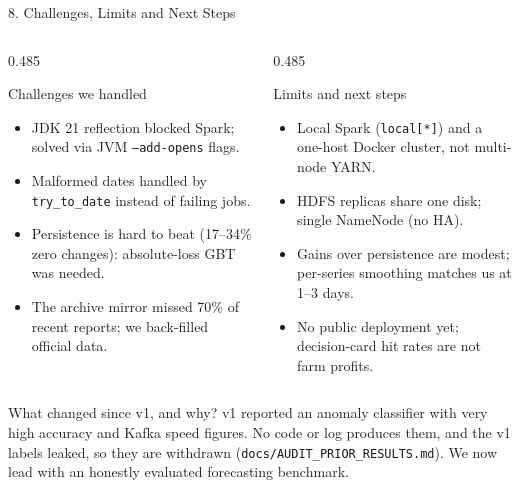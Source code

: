 \documentclass[aspectratio=169,10pt]{beamer}
\begin{document}
\begin{frame}{8. Challenges, Limits and Next Steps}
  \begin{columns}[T,onlytextwidth]
    \begin{column}{0.485\textwidth}
      \begin{block}{Challenges we handled}
        \footnotesize
        \begin{itemize}
          \item JDK 21 reflection blocked Spark; solved via JVM \texttt{--add-opens} flags.
          \item Malformed dates handled by \texttt{try\_to\_date} instead of failing jobs.
          \item Persistence is hard to beat (17--34\% zero changes): absolute-loss GBT was needed.
          \item The archive mirror missed 70\% of recent reports; we back-filled official data.
        \end{itemize}
      \end{block}
    \end{column}

    \begin{column}{0.485\textwidth}
      \begin{block}{Limits and next steps}
        \footnotesize
        \begin{itemize}
          \item Local Spark (\texttt{local[*]}) and a one-host Docker cluster, not multi-node YARN.
          \item HDFS replicas share one disk; single NameNode (no HA).
          \item Gains over persistence are modest; per-series smoothing matches us at 1--3 days.
          \item No public deployment yet; decision-card hit rates are not farm profits.
        \end{itemize}
      \end{block}
    \end{column}
  \end{columns}

  \vspace{0.05cm}
  \begin{block}{What changed since v1, and why?}
    \footnotesize
    v1 reported an anomaly classifier with very high accuracy and Kafka speed figures. No code or log produces them, and the v1 labels leaked, so they are withdrawn (\texttt{docs/AUDIT\_PRIOR\_RESULTS.md}). We now lead with an honestly evaluated forecasting benchmark.
  \end{block}

  \vspace{0.05cm}
\end{frame}
\end{document}
